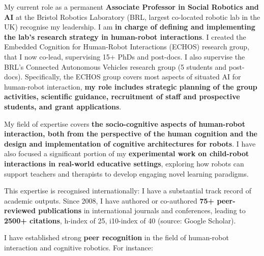 My current role as a permanent \textbf{Associate Professor in Social Robotics
and AI} at the Bristol Robotics Laboratory (BRL, largest co-located robotic lab
in the UK) recognise my leadership. I am \textbf{in charge of defining and
implementing the lab's research strategy in human-robot interactions}. I created
the Embedded Cognition for Human-Robot Interactions (ECHOS) research group, that
I now co-lead, supervising 15+ PhDs and post-docs. I also supervise the BRL's
Connected Autonomous Vehicles research group (5 students and post-docs).
Specifically, the ECHOS group covers most aspects of situated AI for human-robot
interaction, \textbf{my role includes strategic planning of the group
activities, scientific guidance, recruitment of staff and prospective students,
and grant applications}.

My field of expertise covers \textbf{the socio-cognitive aspects of
human-robot interaction, both from the perspective of the human cognition and
the design and implementation of cognitive architectures for robots}. I have
also focused a significant portion of my \textbf{experimental work on
child-robot interactions in real-world educative settings}, exploring how robots
can support teachers and therapists to develop engaging novel
learning paradigms.

This expertise is recognised internationally: I have a substantial track record
of academic outputs. Since 2008, I have authored or co-authored \textbf{75+ peer-reviewed
publications} in international journals and conferences, leading to \textbf{2500+
citations}, h-index of 25, i10-index of 40 (source: Google Scholar).

I have established strong \textbf{peer recognition} in the field of human-robot interaction
and cognitive robotics. For instance:


